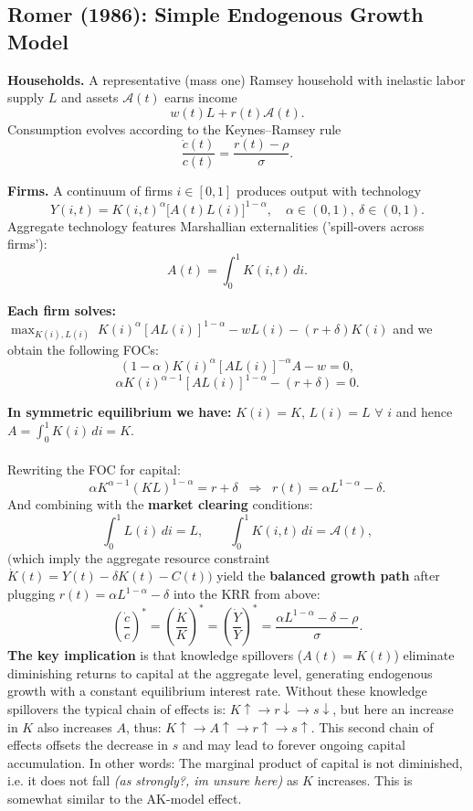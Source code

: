 \subsection{Romer (1986): Simple Endogenous Growth Model}

\textbf{Households.} A representative (mass one) Ramsey household with inelastic labor supply $L$ and assets $\mathcal{A}(t)$ earns income
\[
w(t)L + r(t)\mathcal{A}(t).
\]
Consumption evolves according to the Keynes--Ramsey rule
\[
\frac{\dot{c}(t)}{c(t)} = \frac{r(t) - \rho}{\sigma}.
\]

\noindent \textbf{Firms.} A continuum of firms $i \in [0,1]$ produces output with technology
\[
Y(i,t) = K(i,t)^{\alpha} \bigl[A(t)L(i)\bigr]^{1-\alpha}, \quad \alpha \in (0,1), \ \delta \in (0,1).
\]
Aggregate technology features Marshallian externalities ('spill-overs across firms'):
\[
A(t) = \int_0^1 K(i,t)\, di. 
\]

\noindent \textbf{Each firm solves:} $\max_{K(i),L(i)} \; K(i)^{\alpha}[A L(i)]^{1-\alpha} - wL(i) - (r+\delta)K(i)$ and we obtain the following FOCs:
\[
(1-\alpha)K(i)^{\alpha}[A L(i)]^{-\alpha}A - w = 0,
\]
\[
\alpha K(i)^{\alpha-1}[A L(i)]^{1-\alpha} - (r+\delta) = 0.
\]

\noindent \textbf{In symmetric equilibrium we have:} $K(i)=K$, $L(i)=L$ $\forall$ $i$ and hence $A = \int_0^1 K(i)\,di = K.$\\\\
Rewriting the FOC for capital:
\[
\alpha K^{\alpha-1}(K L)^{1-\alpha} = r+\delta \;\;\Rightarrow\;\; r(t) = \alpha L^{1-\alpha} - \delta.
\]
And combining with the \textbf{market clearing} conditions: 
\[
\int_0^1 L(i)\,di = L, \qquad \int_0^1 K(i,t)\,di = \mathcal{A}(t),
\]
$($which imply the aggregate resource constraint $\dot{K}(t) = Y(t) - \delta K(t) - C(t))$ yield the \textbf{balanced growth path} after plugging $r(t) = \alpha L^{1-\alpha} - \delta$ into the KRR from above: 
\[
\left(\frac{\dot{c}}{c}\right)^* = \left(\frac{\dot{K}}{K}\right)^* = \left(\frac{\dot{Y}}{Y}\right)^* = \frac{\alpha L^{1-\alpha} - \delta - \rho}{\sigma}.
\]
\noindent \textbf{The key implication} is that knowledge spillovers ($A(t)=K(t)$) eliminate diminishing returns to capital at the aggregate level, generating endogenous growth with a constant equilibrium interest rate. Without these knowledge spillovers the typical chain of effects is: $K\uparrow \rightarrow r\downarrow \rightarrow s\downarrow$, but here an increase in $K$ also increases $A$, thus: $K\uparrow \rightarrow A\uparrow \rightarrow r\uparrow \rightarrow s \uparrow$. This second chain of effects offsets the decrease in $s$ and may lead to forever ongoing capital accumulation. In other words: The marginal product of capital is not diminished, i.e. it does not fall \textit{(as strongly?, im unsure here)} as $K$ increases. This is somewhat similar to the AK-model effect.
\par\noindent{\color{lightgray}\rule{\linewidth}{0.4pt}}

